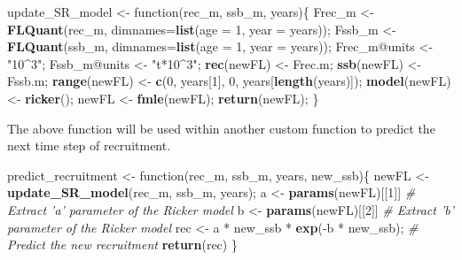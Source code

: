 \documentclass[]{article}
\newenvironment{Shaded}{\begin{snugshade}}{\end{snugshade}}
\newcommand{\KeywordTok}[1]{\textcolor[rgb]{0.13,0.29,0.53}{\textbf{{#1}}}}
\newcommand{\DataTypeTok}[1]{\textcolor[rgb]{0.13,0.29,0.53}{{#1}}}
\newcommand{\DecValTok}[1]{\textcolor[rgb]{0.00,0.00,0.81}{{#1}}}
\newcommand{\StringTok}[1]{\textcolor[rgb]{0.31,0.60,0.02}{{#1}}}
\newcommand{\CommentTok}[1]{\textcolor[rgb]{0.56,0.35,0.01}{\textit{{#1}}}}
\newcommand{\NormalTok}[1]{{#1}}
\begin{document}
\begin{Shaded}
\begin{Highlighting}[]
\NormalTok{update_SR_model <-}\StringTok{ }\NormalTok{function(rec_m, ssb_m, years)\{}
    \NormalTok{Frec_m       <-}\StringTok{ }\KeywordTok{FLQuant}\NormalTok{(rec_m, }\DataTypeTok{dimnames=}\KeywordTok{list}\NormalTok{(}\DataTypeTok{age =} \DecValTok{1}\NormalTok{, }\DataTypeTok{year =} \NormalTok{years));}
    \NormalTok{Fssb_m       <-}\StringTok{ }\KeywordTok{FLQuant}\NormalTok{(ssb_m, }\DataTypeTok{dimnames=}\KeywordTok{list}\NormalTok{(}\DataTypeTok{age =} \DecValTok{1}\NormalTok{, }\DataTypeTok{year =} \NormalTok{years));}
    \NormalTok{Frec_m@units <-}\StringTok{ "10^3"}\NormalTok{;}
    \NormalTok{Fssb_m@units <-}\StringTok{ "t*10^3"}\NormalTok{;}
    \KeywordTok{rec}\NormalTok{(newFL)   <-}\StringTok{ }\NormalTok{Frec.m;}
    \KeywordTok{ssb}\NormalTok{(newFL)   <-}\StringTok{ }\NormalTok{Fssb.m;}
    \KeywordTok{range}\NormalTok{(newFL) <-}\StringTok{ }\KeywordTok{c}\NormalTok{(}\DecValTok{0}\NormalTok{, years[}\DecValTok{1}\NormalTok{], }\DecValTok{0}\NormalTok{, years[}\KeywordTok{length}\NormalTok{(years)]);}
    \KeywordTok{model}\NormalTok{(newFL) <-}\StringTok{ }\KeywordTok{ricker}\NormalTok{();}
    \NormalTok{newFL        <-}\StringTok{ }\KeywordTok{fmle}\NormalTok{(newFL);}
    \KeywordTok{return}\NormalTok{(newFL);}
\NormalTok{\}}
\end{Highlighting}
\end{Shaded}

The above function will be used within another custom function to
predict the next time step of recruitment.

\begin{Shaded}
\begin{Highlighting}[]
\NormalTok{predict_recruitment <-}\StringTok{ }\NormalTok{function(rec_m, ssb_m, years, new_ssb)\{}
    \NormalTok{newFL <-}\StringTok{ }\KeywordTok{update_SR_model}\NormalTok{(rec_m, ssb_m, years);}
    \NormalTok{a     <-}\StringTok{ }\KeywordTok{params}\NormalTok{(newFL)[[}\DecValTok{1}\NormalTok{]] }\CommentTok{# Extract 'a' parameter of the Ricker model}
    \NormalTok{b     <-}\StringTok{ }\KeywordTok{params}\NormalTok{(newFL)[[}\DecValTok{2}\NormalTok{]] }\CommentTok{# Extract 'b' parameter of the Ricker model}
    \NormalTok{rec   <-}\StringTok{ }\NormalTok{a *}\StringTok{ }\NormalTok{new_ssb *}\StringTok{ }\KeywordTok{exp}\NormalTok{(-b *}\StringTok{ }\NormalTok{new_ssb); }\CommentTok{# Predict the new recruitment}
    \KeywordTok{return}\NormalTok{(rec)}
\NormalTok{\}}
\end{Highlighting}
\end{Shaded}
\end{document}
